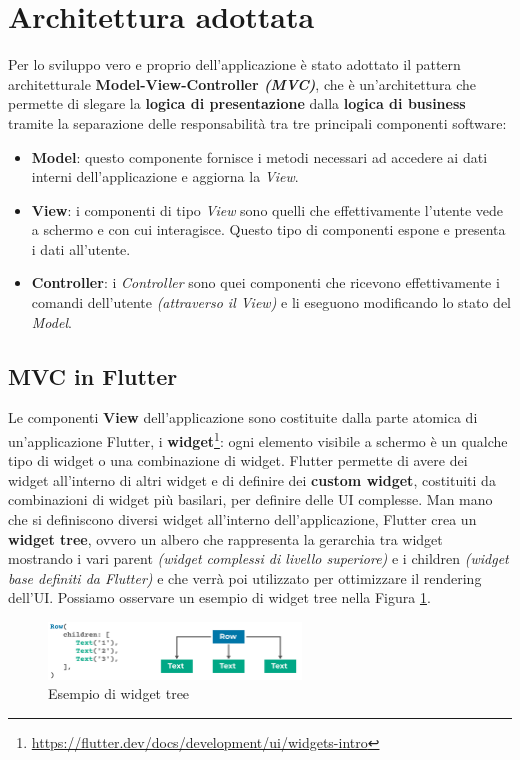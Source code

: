 \newpage \newpage

\section{Architettura adottata}
Per lo sviluppo vero e proprio dell'applicazione è stato adottato il pattern architetturale \textbf{Model-View-Controller \textit{(MVC)}}\cite{MVC}, che è un'architettura che permette di slegare la \textbf{logica di presentazione} dalla \textbf{logica di business} tramite la separazione delle responsabilità tra tre principali componenti software:
\begin{itemize}
\item \textbf{Model}: questo componente fornisce i metodi necessari ad accedere ai dati interni dell'applicazione e aggiorna la \textit{View}.
\item \textbf{View}: i componenti di tipo \textit{View} sono quelli che effettivamente l'utente vede a schermo e con cui interagisce. Questo tipo di componenti espone e presenta i dati all'utente.
\item \textbf{Controller}: i \textit{Controller} sono quei componenti che ricevono effettivamente i comandi dell'utente \textit{(attraverso il View)} e li eseguono modificando lo stato del \textit{Model}.
\end{itemize}

\subsection{MVC in Flutter}
Le componenti \textbf{View} dell'applicazione sono costituite dalla parte atomica di un'applicazione Flutter, i \textbf{widget}\footnote{\url{https://flutter.dev/docs/development/ui/widgets-intro}}: ogni elemento visibile a schermo è un qualche tipo di widget o una combinazione di widget. Flutter permette di avere dei widget all'interno di altri widget e di definire dei \textbf{custom widget}, costituiti da combinazioni di widget più basilari, per definire delle UI complesse. Man mano che si definiscono diversi widget all'interno dell'applicazione, Flutter crea un \textbf{widget tree}, ovvero un albero che rappresenta la gerarchia tra widget mostrando i vari parent \textit{(widget complessi di livello superiore)} e i children \textit{(widget base definiti da Flutter)} e che verrà poi utilizzato per ottimizzare il rendering dell'UI.
Possiamo osservare un esempio di widget tree nella Figura \ref{fig:widget_tree}.

\begin{figure}[h]
\centering
\includegraphics[width=0.6\textwidth]{img/widget_tree}
\caption{Esempio di widget tree}
\label{fig:widget_tree}
\end{figure}

